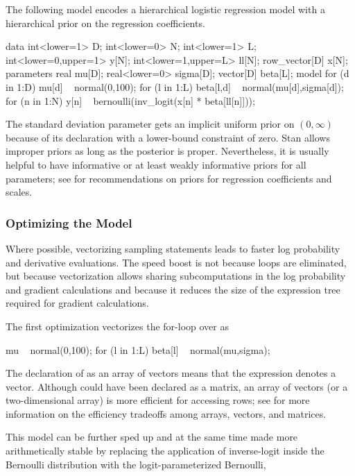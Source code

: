 The following model encodes a hierarchical logistic regression model
with a hierarchical prior on the regression coefficients.
%

\begin{stancode}
data {
  int<lower=1> D;
  int<lower=0> N;
  int<lower=1> L;
  int<lower=0,upper=1> y[N];
  int<lower=1,upper=L> ll[N];
  row_vector[D] x[N];
}
parameters {
  real mu[D];
  real<lower=0> sigma[D];
  vector[D] beta[L];
}
model {
  for (d in 1:D) {
    mu[d] ~ normal(0,100);
    for (l in 1:L)
      beta[l,d] ~ normal(mu[d],sigma[d]);
  }
  for (n in 1:N)
    y[n] ~ bernoulli(inv_logit(x[n] * beta[ll[n]]));
}
\end{stancode}  
%
The standard deviation parameter  gets an implicit uniform
prior on $(0,\infty)$ because of its declaration with a lower-bound
constraint of zero.  Stan allows improper priors as long as the
posterior is proper.  Nevertheless, it is usually helpful to have
informative or at least weakly informative priors for all parameters;
see  for recommendations on priors for
regression coefficients and scales.

\subsubsection{Optimizing the Model}

Where possible, vectorizing sampling statements leads to faster log
probability and derivative evaluations.  The speed boost is not
because loops are eliminated, but because vectorization allows sharing
subcomputations in the log probability and gradient calculations and
because it reduces the size of the expression tree required for
gradient calculations.

The first optimization vectorizes the for-loop over  as
%

\begin{stancode}
  mu ~ normal(0,100);
  for (l in 1:L)
    beta[l] ~ normal(mu,sigma);
\end{stancode}
%
The declaration of  as an array of vectors means that the
expression  denotes a vector.  Although 
could have been declared as a matrix, an array of vectors (or a
two-dimensional array) is more efficient for accessing rows; see
 for more information on the efficiency
tradeoffs among arrays, vectors, and matrices.

This model can be further sped up and at the same time made more
arithmetically stable by replacing the application of inverse-logit
inside the Bernoulli distribution with the logit-parameterized
Bernoulli,
%

